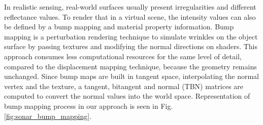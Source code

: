 \documentclass[final,5p,times]{elsarticle}
\begin{document}
In realistic sensing, real-world surfaces usually present irregularities
and different reflectance values. To render that in a virtual scene, the
intensity values can also be defined by a bump mapping and material
property information. Bump mapping is a perturbation rendering technique
to simulate wrinkles on the object surface by passing textures and modifying
the normal directions on shaders. This approach consumes less computational
resources for the same level of detail, compared to the displacement mapping
technique, because the geometry remains unchanged. Since bump maps are
built in tangent space, interpolating the normal vertex and the texture,
a tangent, bitangent and normal (TBN) matrices are computed to convert the
normal values into the world space. Representation of bump mapping process
in our approach is seen in Fig. \ref{fig:sonar_bump_mapping}.
\end{document}
